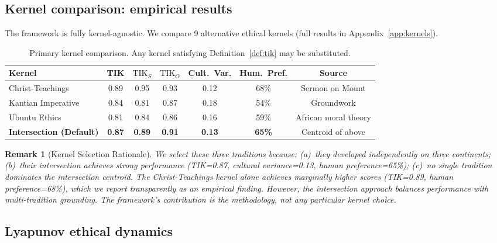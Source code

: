 \documentclass[11pt]{article}
\newtheorem{remark}{Remark}
\newcommand{\TIK}{\text{TIK}}
\begin{document}
\subsection{Kernel comparison: empirical results}
\label{sec:kernel-empirical}

The framework is fully kernel-agnostic. We compare 9 alternative ethical kernels (full results in Appendix~\ref{app:kernels}).

\begin{table}[h]
\centering
\small
\caption{Primary kernel comparison. Any kernel satisfying Definition~\ref{def:tik} may be substituted.}
\label{tab:primary-kernels}
\begin{tabular}{lcccccc}
\toprule
\textbf{Kernel} & \textbf{TIK} & $\TIK_S$ & $\TIK_O$ & \textbf{Cult.\ Var.} & \textbf{Hum.\ Pref.} & \textbf{Source} \\
\midrule
Christ-Teachings & 0.89 & 0.95 & 0.93 & 0.12 & 68\% & Sermon on Mount \\
Kantian Imperative & 0.84 & 0.81 & 0.87 & 0.18 & 54\% & Groundwork \\
Ubuntu Ethics & 0.81 & 0.84 & 0.86 & 0.16 & 59\% & African moral theory \\
\midrule
\textbf{Intersection (Default)} & \textbf{0.87} & \textbf{0.89} & \textbf{0.91} & \textbf{0.13} & \textbf{65\%} & Centroid of above \\
\bottomrule
\end{tabular}
\end{table}

\begin{remark}[Kernel Selection Rationale]
\label{rem:kernel-selection}
We select these three traditions because: (a)~they developed independently on three continents; (b)~their intersection achieves strong performance (TIK=0.87, cultural variance=0.13, human preference=65\%); (c)~no single tradition dominates the intersection centroid. The Christ-Teachings kernel alone achieves marginally higher scores (TIK=0.89, human preference=68\%), which we report transparently as an empirical finding. However, the intersection approach balances performance with multi-tradition grounding. The framework's contribution is the \textit{methodology}, not any particular kernel choice.
\end{remark}

\subsection{Lyapunov ethical dynamics}
\label{sec:lyapunov-brief}
\end{document}
